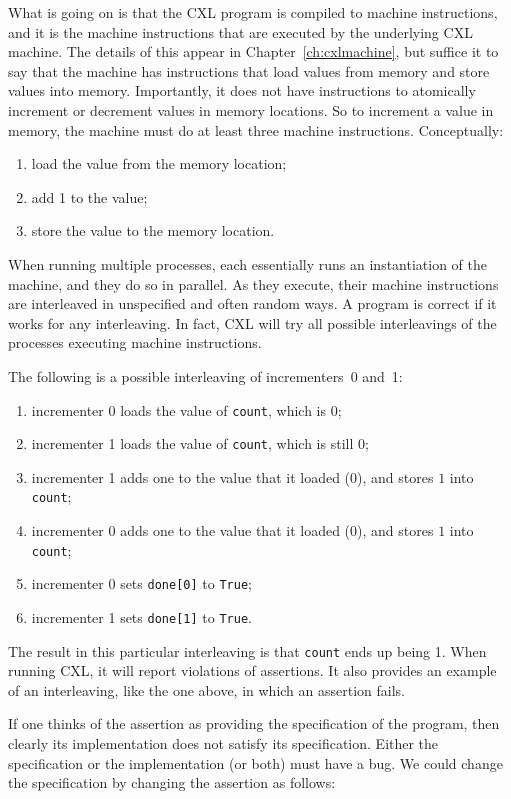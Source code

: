 \documentclass{report}
\begin{document}
What is going on is that the CXL program is compiled to machine instructions,
and it is the machine instructions that are executed by the underlying CXL
machine.  The details of this appear in Chapter~\ref{ch:cxlmachine},
but suffice it to
say that the machine has instructions that load values from memory and store
values into memory.  Importantly, it does not have instructions to atomically
increment or decrement values in memory locations.
So to increment a value in memory,
the machine must do at least three machine instructions.  Conceptually:
\begin{enumerate}
\item load the value from the memory location;
\item add 1 to the value;
\item store the value to the memory location.
\end{enumerate}

When running multiple processes, each essentially runs an instantiation of
the machine, and they do so in parallel.  As they execute, their machine
instructions are interleaved in unspecified and often random ways.
A program is correct if it works for any interleaving.
In fact, CXL will try all possible interleavings of the processes
executing machine instructions.

The following is a possible interleaving of incrementers~0 and~1:
\begin{enumerate}
\item incrementer 0 loads the value of \texttt{count}, which is 0;
\item incrementer 1 loads the value of \texttt{count}, which is still 0;
\item incrementer 1 adds one to the value that it loaded (0), and
stores $1$ into \texttt{count};
\item incrementer 0 adds one to the value that it loaded (0), and
stores $1$ into \texttt{count};
\item incrementer 0 sets \texttt{done[0]} to \texttt{True};
\item incrementer 1 sets \texttt{done[1]} to \texttt{True}.
\end{enumerate}

The result in this particular interleaving is that \texttt{count} ends up
being 1.  When running CXL, it will
report violations of assertions.  It also provides an example
of an interleaving, like the one above, in which an assertion fails.

If one thinks of the assertion as providing the specification of the
program, then clearly its implementation does not satisfy its specification.
Either the specification or the implementation (or both) must have a bug.
We could change the specification by changing the assertion as follows:
\end{document}
